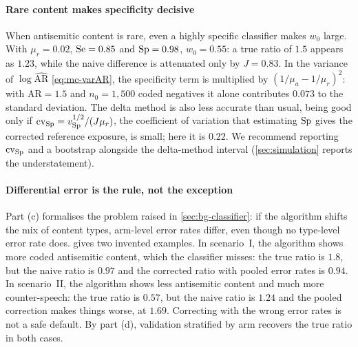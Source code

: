 \paragraph{Rare content makes specificity decisive}
When antisemitic content is rare, even a highly specific classifier makes $w_0$ large. With $\mu_r=0.02$, $\mathrm{Se}=0.85$ and $\mathrm{Sp}=0.98$, $w_0=0.55$: a true ratio of $1.5$ appears as $1.23$, while the naive difference is attenuated only by $J=0.83$. In the variance of $\log\widehat{\mathrm{AR}}$ \eqref{eq:mc-varAR}, the specificity term is multiplied by $(1/\mu_a-1/\mu_r)^2$: with $\mathrm{AR}=1.5$ and $n_0=1{,}500$ coded negatives it alone contributes $0.073$ to the standard deviation. The delta method is also less accurate than usual, being good only if $\mathrm{cv}_{\mathrm{Sp}}=v_{\mathrm{Sp}}^{1/2}/(J\mu_r)$, the coefficient of variation that estimating $\mathrm{Sp}$ gives the corrected reference exposure, is small; here it is $0.22$. We recommend reporting $\mathrm{cv}_{\mathrm{Sp}}$ and a bootstrap alongside the delta-method interval (\cref{sec:simulation} reports the understatement).

\paragraph{Differential error is the rule, not the exception}
Part (c) formalises the problem raised in \cref{sec:bg-classifier}: if the algorithm shifts the mix of content types, arm-level error rates differ, even though no type-level error rate does.  gives two invented examples. In scenario~I, the algorithm shows more coded antisemitic content, which the classifier misses: the true ratio is $1.8$, but the naive ratio is $0.97$ and the corrected ratio with pooled error rates is $0.94$. In scenario~II, the algorithm shows less antisemitic content and much more counter-speech: the true ratio is $0.57$, but the naive ratio is $1.24$ and the pooled correction makes things worse, at $1.69$. Correcting with the wrong error rates is not a safe default. By part (d), validation stratified by arm recovers the true ratio in both cases.

